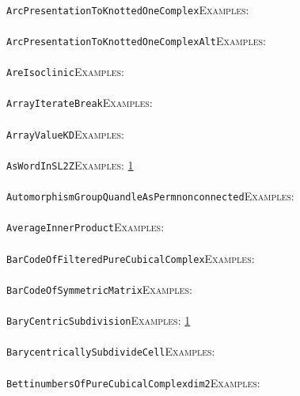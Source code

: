 \documentclass[a4paper,11pt]{report}
\begin{document}
{{ \\
 \texttt{ArcPresentationToKnottedOneComplex}{\nobreakspace}{\nobreakspace}{\nobreakspace}{\nobreakspace}\textsc{Examples:} \\
 \\
 \texttt{ArcPresentationToKnottedOneComplex{\textunderscore}Alt}{\nobreakspace}{\nobreakspace}{\nobreakspace}{\nobreakspace}\textsc{Examples:} \\
 \\
 \texttt{AreIsoclinic}{\nobreakspace}{\nobreakspace}{\nobreakspace}{\nobreakspace}\textsc{Examples:} \\
 \\
 \texttt{ArrayIterateBreak}{\nobreakspace}{\nobreakspace}{\nobreakspace}{\nobreakspace}\textsc{Examples:} \\
 \\
 \texttt{ArrayValueKD}{\nobreakspace}{\nobreakspace}{\nobreakspace}{\nobreakspace}\textsc{Examples:} \\
 \\
 \texttt{AsWordInSL2Z}{\nobreakspace}{\nobreakspace}{\nobreakspace}{\nobreakspace}\textsc{Examples:} \href{tutorial/chap10.html} {1}{\nobreakspace} \\
 \\
 \texttt{AutomorphismGroupQuandleAsPerm{\textunderscore}nonconnected}{\nobreakspace}{\nobreakspace}{\nobreakspace}{\nobreakspace}\textsc{Examples:} \\
 \\
 \texttt{AverageInnerProduct}{\nobreakspace}{\nobreakspace}{\nobreakspace}{\nobreakspace}\textsc{Examples:} \\
 \\
 \texttt{BarCodeOfFilteredPureCubicalComplex}{\nobreakspace}{\nobreakspace}{\nobreakspace}{\nobreakspace}\textsc{Examples:} \\
 \\
 \texttt{BarCodeOfSymmetricMatrix}{\nobreakspace}{\nobreakspace}{\nobreakspace}{\nobreakspace}\textsc{Examples:} \\
 \\
 \texttt{BaryCentricSubdivision}{\nobreakspace}{\nobreakspace}{\nobreakspace}{\nobreakspace}\textsc{Examples:} \href{tutorial/chap8.html} {1}{\nobreakspace} \\
 \\
 \texttt{BarycentricallySubdivideCell}{\nobreakspace}{\nobreakspace}{\nobreakspace}{\nobreakspace}\textsc{Examples:} \\
 \\
 \texttt{BettinumbersOfPureCubicalComplex{\textunderscore}dim{\textunderscore}2}{\nobreakspace}{\nobreakspace}{\nobreakspace}{\nobreakspace}\textsc{Examples:} \\
}}
\end{document}
